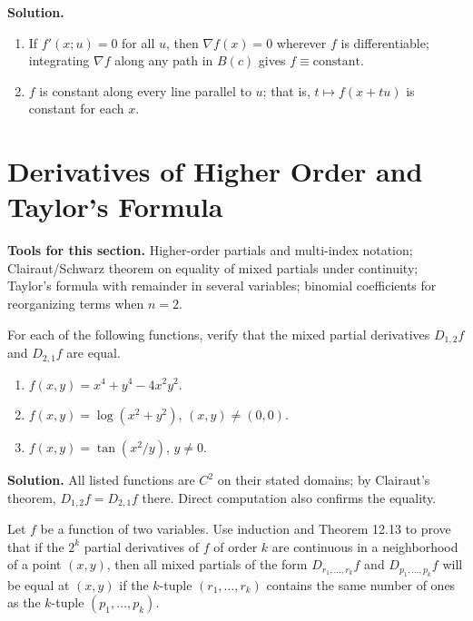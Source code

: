 \noindent\textbf{Solution.}
\begin{enumerate}[label=(\alph*)]
\item If $f'(x;u)=0$ for all $u$, then $\nabla f(x)=0$ wherever $f$ is differentiable; integrating $\nabla f$ along any path in $B(c)$ gives $f\equiv\text{constant}$.
\item $f$ is constant along every line parallel to $u$; that is, $t\mapsto f(x+tu)$ is constant for each $x$.
\end{enumerate}

\section{Derivatives of Higher Order and Taylor's Formula}

\noindent\textbf{Tools for this section.} Higher-order partials and multi-index notation; Clairaut/Schwarz theorem on equality of mixed partials under continuity; Taylor's formula with remainder in several variables; binomial coefficients for reorganizing terms when $n=2$.

\begin{problembox}
For each of the following functions, verify that the mixed partial derivatives \( D_{1,2}f \) and \( D_{2,1}f \) are equal.
\begin{enumerate}[label=(\alph*)]
\item \( f(x, y) = x^4 + y^4 - 4x^2y^2 \).
\item \( f(x, y) = \log (x^2 + y^2) \), \( (x, y) \neq (0, 0) \).
\item \( f(x, y) = \tan (x^2/y) \), \( y \neq 0 \).
\end{enumerate}
\end{problembox}

\noindent\textbf{Solution.}
All listed functions are $C^2$ on their stated domains; by Clairaut's theorem, $D_{1,2}f=D_{2,1}f$ there. Direct computation also confirms the equality.

\begin{problembox}
Let \( f \) be a function of two variables. Use induction and Theorem 12.13 to prove that if the \( 2^k \) partial derivatives of \( f \) of order \( k \) are continuous in a neighborhood of a point \( (x, y) \), then all mixed partials of the form \( D_{r_1, \ldots, r_k} f \) and \( D_{p_1, \ldots, p_k} f \) will be equal at \( (x, y) \) if the \( k \)-tuple \( (r_1, \ldots, r_k) \) contains the same number of ones as the \( k \)-tuple \( (p_1, \ldots, p_k) \).
\end{problembox}

